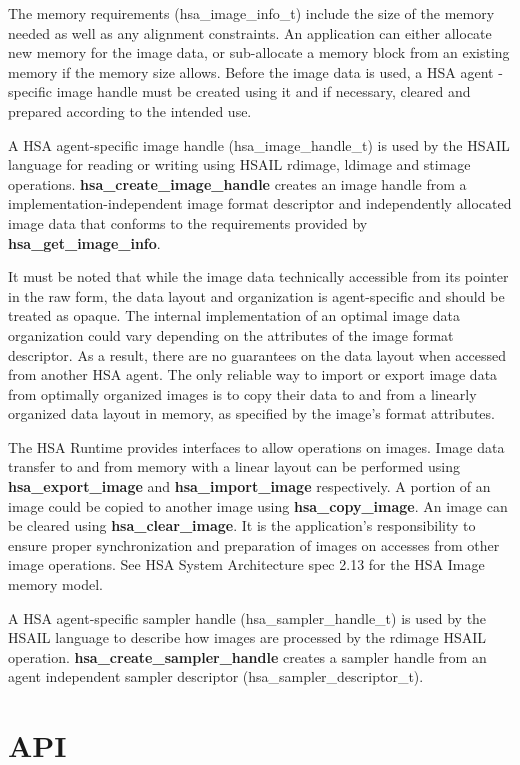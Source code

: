 \documentclass{book}
\newcommand{\reffun}[1]{\textbf{#1}}
\newcommand{\reftyp}[1]{#1}
\begin{document}
\begin{appendices}
The memory requirements (\reftyp{hsa\_image\_info\_t}) include the size
of the memory needed as well as any alignment constraints. An
application can either allocate new memory for the image data, or
sub-allocate a memory block from an existing memory if the memory size
allows. Before the image data is used, a HSA agent -specific image
handle must be created using it and if necessary, cleared and prepared
according to the intended use.

A HSA agent-specific image handle (\reftyp{hsa\_image\_handle\_t}) is
used by the HSAIL language for reading or writing using HSAIL rdimage,
ldimage and stimage operations. \reffun{hsa\_create\_image\_handle}
creates an image handle from a implementation-independent image format
descriptor and independently allocated image data that conforms to the
requirements provided by \reffun{hsa\_get\_image\_info}.

It must be noted that while the image data technically accessible from
its pointer in the raw form, the data layout and organization is
agent-specific and should be treated as opaque. The internal
implementation of an optimal image data organization could vary
depending on the attributes of the image format descriptor. As a
result, there are no guarantees on the data layout when accessed from
another HSA agent. The only reliable way to import or export image
data from optimally organized images is to copy their data to and from
a linearly organized data layout in memory, as specified by the
image’s format attributes.

The HSA Runtime provides interfaces to allow operations on
images. Image data transfer to and from memory with a linear layout
can be performed using \reffun{hsa\_export\_image} and
\reffun{hsa\_import\_image} respectively. A portion of an image could be
copied to another image using \reffun{hsa\_copy\_image}. An image can be
cleared using \reffun{hsa\_clear\_image}. It is the application’s
responsibility to ensure proper synchronization and preparation of
images on accesses from other image operations. See HSA System
Architecture spec 2.13 for the HSA Image memory model.

A HSA agent-specific sampler handle (\reftyp{hsa\_sampler\_handle\_t})
is used by the HSAIL language to describe how images are processed by
the rdimage HSAIL operation. \reffun{hsa\_create\_sampler\_handle}
creates a sampler handle from an agent independent sampler descriptor
(\reftyp{hsa\_sampler\_descriptor\_t}).

\hypertarget{Images API}{\section{API} \label{images_api}}
\makeatletter{}


\end{appendices}
\end{document}
